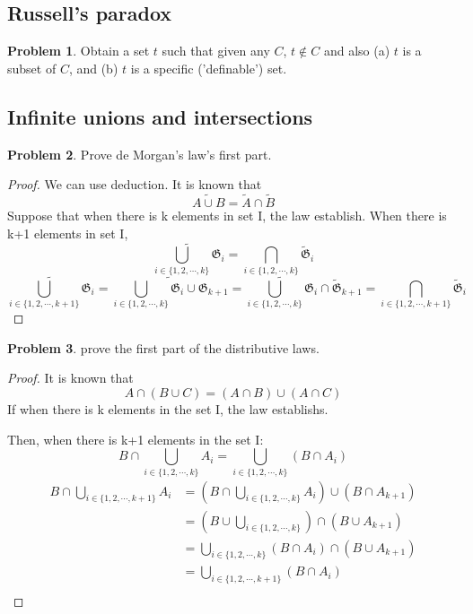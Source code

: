 \documentclass[a4paper,11pt]{article}%
\theoremstyle{remark}
\theoremstyle{definition}
\newtheorem{problem}{Problem}[subsection]
\begin{document}
\subsection{Russell's paradox}
\begin{problem}
    Obtain a set $t$ such that given any $C$, $t\notin C$ and also (a)
    $t$ is a subset of $C$, and (b) $t$ is a specific ('definable') set.
\end{problem}
\subsection{Infinite unions and intersections}
\begin{problem}
    Prove de Morgan's law's first part.
    \begin{proof}
       We can use deduction.
       It is known that
       \[\widetilde{A\cup B}=\tilde{A}\cap \tilde{B}\] 
       Suppose that when there is k elements in set I, the law establish.
        When there is k+1 elements in set I,
        \[\widetilde{\bigcup_{i\in\{1,2,\cdots,k\}}\mathfrak{G}_i}=\bigcap_{i\in\{1,2,\cdots,k\}}\tilde{\mathfrak{G}}_i\]
        \[\widetilde{\bigcup_{i\in\{1,2,\cdots,k+1\}}\mathfrak{G}_i}=\widetilde{\bigcup_{i\in\{1,2,\cdots,k\}}\mathfrak{G}_i\cup \mathfrak{G}_{k+1}}
        =\widetilde{\bigcup_{i\in\{1,2,\cdots,k\}}\mathfrak{G}_i}\cap \tilde{\mathfrak{G}}_{k+1}=\bigcap_{i\in\{1,2,\cdots,k+1\}}\tilde{\mathfrak{G}}_i\]
    \end{proof}
\end{problem}
\begin{problem}
    prove the first part of the distributive laws.
    \begin{proof}
       It is known that
       \[A\cap(B\cup C)=(A\cap B)\cup (A\cap C)\] 
       If when there is k elements in the set I, the law establishs.
       
       Then, when there is k+1 elements in the set I:
       \[B\cap\bigcup_{i\in \{1,2,\cdots,k\}}A_i=\bigcup_{i\in\{1,2,\cdots,k\}}(B\cap A_i)\]
       \[
        \begin{array}{rl}
            B\cap\bigcup_{i\in\{1,2,\cdots,k+1\}}A_i&=(B\cap\bigcup_{i\in\{1,2,\cdots,k\}}A_i)\cup (B\cap A_{k+1})\\
                                                   &= (B\cup \bigcup_{i\in\{1,2,\cdots,k\}})\cap(B\cup A_{k+1})\\
                                                   &=\bigcup_{i\in\{1,2,\cdots,k\}}(B\cap A_i)\cap (B\cup A_{k+1})\\
                                                   &=\bigcup_{i\in\{1,2,\cdots,k+1\}}(B\cap A_i)\\
        \end{array}
       \]
    \end{proof}
\end{problem}
\end{document}

